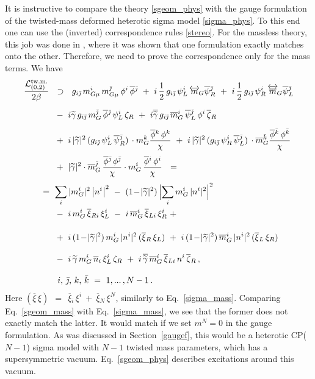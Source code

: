 \documentclass[12pt]{article}
\newcommand{\wt}{\widetilde}
\newcommand{\ov}{\overline}
\newcommand{\mc}[1]{\mathcal{#1}}
\newcommand{\bxir}{\ov{\xi}{}_R}
\newcommand{\bxil}{\ov{\xi}{}_L}
\newcommand{\xir}{\xi_R}
\newcommand{\xil}{\xi_L}
\newcommand{\bzr}{\ov{\zeta}{}_R}
\newcommand{\zr}{\zeta_R}
\newcommand{\tgamma}{\wt{\gamma}}
\newcommand{\btgamma}{\ov{\tgamma}}
\newcommand{\bpsi}{\ov{\psi}{}}
\newcommand{\bphi}{\ov{\phi}{}}
\newcommand{\bxi}{\ov{\xi}{}}
\newcommand{\bj}{{\bar \jmath}}
\newcommand{\bk}{{\bar k}}
\begin{document}
	It is instructive to compare the theory \eqref{sgeom_phys} with the gauge formulation of  the
	twisted-mass deformed heterotic sigma
	model  \eqref{sigma_phys}. To this end one
can use the (inverted) correspondence rules \eqref{stereo}. 
	For the massless theory, this job was done in \cite{BSYhet}, where it was shown that one formulation exactly
	matches onto the other.
	Therefore, we need to prove the correspondence only for the mass  terms.
	We have
\begin{align}
%
\notag
	\frac{\mc{L}_{(0,2)}^\text{tw.m.}}{2\beta} & ~~\supset~~ 
	g_{i\bj}\, m_{G\mu}^i\,m_{G\mu}^\bj\, \phi^i\, \bphi^\bj
	~+~ i\,\frac{1}{2}\,g_{i\bj}\,\psi_L^i\, \overleftrightarrow{m}{}_{\!G} \bpsi_R^\bj
	~+~ i\,\frac{1}{2}\,g_{i\bj}\,\psi_R^i\, \overleftrightarrow{\ov{m}}{}_{\!G} \bpsi_L^\bj
	\\[2mm]
%
\notag
	&~
	~-~ i\tgamma\, g_{i\bj}\, m_G^\bj\,\bphi^\bj\, \psi_L^i\,\zr
	~+~ i\btgamma\, g_{i\bj}\,\ov{m}{}_G^i\, \bpsi_L^\bj\, \phi^i\,\bzr
	\\[2mm]
%
\notag
	&~
	~+~ i\, |\tgamma|^2\, (g_{i\bj}\,\psi_L^i\,\bpsi_R^\bj)\, \cdot m_G^k \frac{\bphi^k\, \phi^k}{\chi}
	~+~ i\, |\tgamma|^2\, (g_{i\bj}\,\psi_R^i\,\bpsi_L^\bj)\, \cdot \ov{m}{}_G^\bk \frac{\bphi^\bk\,\phi^\bk}{\chi}
	\\[1mm]
%
\notag
	&~
	~+~ |\tgamma|^2 \cdot \ov{m}{}_G^\bj\,\frac{\bphi^\bj\,\phi^\bj}{\chi}
			\cdot m_G^i\, \frac{\bphi^i\, \phi^i}{\chi}
	~~=~~
	\\[1mm]
%
\label{sgeom_mass}
	&\!\!\!\!\!\!\!\!
	~=~
	\sum_i |m_G^i|^2 \left|n^i \right|^2 ~-~ (1 \!-\! |\tgamma|^2)\, \Bigl| \sum_i m_G^i\, |n^i|^2 \Bigr|^2 
	\\
%
\notag
	&~
	~-~ i\,m_G^i\,\bxi_{Ri}\,\xi_L^i 
	~-~ i\,\ov{m}{}_G^i\, \bxi_{Li}\, \xi_R^i ~+~
	\\[4mm]
%
\notag
	&~
	~+~ i\,(1\!-\!|\tgamma|^2)\, m_G^i\,|n^i|^2\, (\bxir\,\xil) 
	~+~ i\,(1\!-\!|\tgamma|^2)\, \ov{m}{}_G^i\,|n^i|^2\, (\bxil\,\xir)
	\\[3mm]
%
\notag
	&~
	~-~ i\,\tgamma\, m_G^i\,\ov{n}{}_i\, \xi_L^i\, \zr
	~+~ i\,\btgamma\, \ov{m}{}_G^i\, \bxi_{Li}\, n^i\, \bzr\,,
	\\[3mm]
%
\notag
	&~~~
	\text{$i$, $\bj$, $k$, $\bk$} ~=~ 1,...\,, N-1\,.
\end{align}
	Here 
$
	(\ov{\xi}\, \xi) ~~=~~ \ov{\xi}{}_i\, \xi^i  ~+~  \ov{\xi}{}_N\, \xi^N
$,
	similarly to Eq.~\eqref{sigma_mass}.
	Comparing Eq.~\eqref{sgeom_mass} with Eq.~\eqref{sigma_mass}, we   see that the former
	does not   exactly match   the latter.
	It would match if we set $ m^N = 0 $ in the gauge formulation.
	As was discussed in Section~\ref{gaugef}, this would be a heterotic CP($N-1$) sigma model
	with $ N-1 $ twisted mass parameters, which has a supersymmetric vacuum.
	Eq.~\eqref{sgeom_phys} describes excitations around this vacuum.
\end{document}
